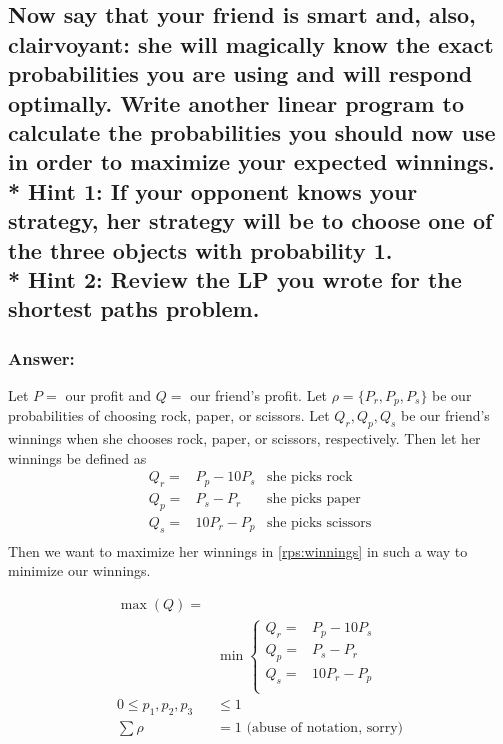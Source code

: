 \documentclass[titlepage]{article}\usepackage[]{graphicx}\usepackage[]{color}
\begin{document}
  \subsection{Now say that your friend is smart and, also,
        clairvoyant: she will magically know the exact probabilities you are
        using and will respond optimally. Write another linear program to
        calculate the probabilities you should now use in order to maximize your
        expected winnings. \\* Hint 1: If your opponent knows your strategy, her
        strategy will be to choose one of the three objects with probability 1.
      \\* Hint 2: Review the LP you wrote for the shortest paths problem.}
  \subsubsection{Answer:}
  Let $P = $ our profit and $Q = $ our friend's profit. Let $\rho = \{P_r, P_p, P_s\}$ be
  our probabilities of choosing rock, paper, or scissors. Let $Q_r, Q_p, Q_s$
  be our friend's winnings when she chooses rock, paper, or scissors,
  respectively.
  Then let her winnings be defined as
  \begin{equation}
    \begin{aligned}
      Q_r =& P_p - 10P_s &\text{she picks rock} \\
      Q_p =& P_s - P_r   &\text{she picks paper} \\
      Q_s =& 10P_r - P_p &\text{she picks scissors} \\
    \end{aligned}
    \label{rps:winnings}
  \end{equation}
  Then we want to maximize her winnings in \ref{rps:winnings} in such a way to
  minimize our winnings. 

  \begin{equation}
    \begin{aligned}
      \label{rps:constraints}
      \max(Q) =& \\
      &\min \begin{cases} Q_r =& P_p - 10P_s \\
                    Q_p =& P_s - P_r   \\
                    Q_s =& 10P_r - P_p \\
                  \end{cases} \\
       0 \leq p_1, p_2, p_3 &\leq 1 \\ 
       \sum \rho  &= 1  \text{  (abuse of notation, sorry)}
    \end{aligned}
  \end{equation}
\end{document}
